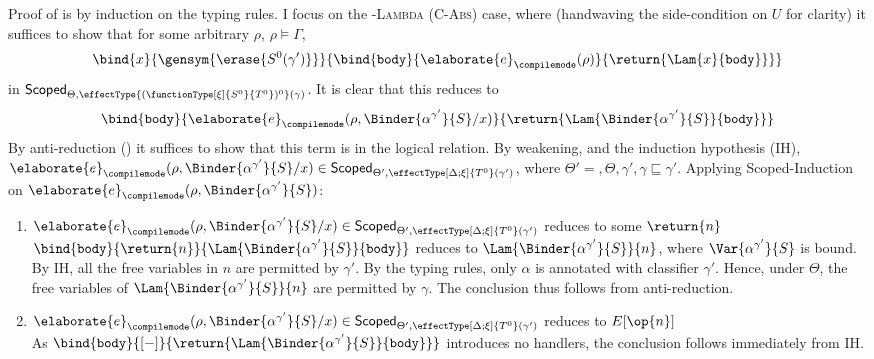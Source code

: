 Proof of  is by induction on the \recLang{} typing rules. I focus on the \textsc{\compilemode{}-Lambda} (\textsc{C-Abs}) case, where (handwaving the side-condition on $U$ for clarity) it suffices to show that for some arbitrary $\rho$, $\rho \vDash \Gamma$, 
\[\bind{x}{\gensym{\erase{S^0 (\gamma')}}}{\bind{\texttt{body}}{\elaborate{e}_{\compilemode}({\rho})}{\return{\Lam{x}{\texttt{body}}}}}\]
in $\scoped{\effectType{(\functionType[\xi]{S^0}{T^0})^0} (\gamma)}$. It is clear that this reduces to
\[{\bind{\texttt{body}}{\elaborate{e}_{\compilemode}({\rho, \Binder{\alpha^{\gamma'}}{S} / x})}{\return{\Lam{\Binder{\alpha^{\gamma'}}{S}}{\texttt{body}}}}}\]
 By anti-reduction () it suffices to show that this term is in the logical relation. By weakening, and the induction hypothesis (IH), $\elaborate{e}_{\compilemode}({\rho, \Binder{\alpha^{\gamma'}}{S} / x}) \in \scoped[\Theta']{\effectType[\Delta; \xi]{T^{0}} (\gamma')}$, where $\Theta' = , \Theta, \gamma', \gamma \sqsubseteq \gamma'$. Applying \textsf{Scoped}-Induction on $\elaborate{e}_{\compilemode}({\rho, \Binder{\alpha^{\gamma'}}{S}})$:
\begin{enumerate}
  \item $\elaborate{e}_{\compilemode}({\rho, \Binder{\alpha^{\gamma'}}{S} / x}) \in \scoped[\Theta']{\effectType[\Delta; \xi]{T^{0}} (\gamma')}$ reduces to some $\return{n}$\\
   $\bind{\texttt{body}}{\return{n}}{\Lam{\Binder{\alpha^{\gamma'}}{S}}{\texttt{body}}}$ reduces to $\Lam{\Binder{\alpha^{\gamma'}}{S}}{n}$, where $\Var{\alpha^{\gamma'}}{S}$ is bound. By IH, all the free variables in $n$ are permitted by $\gamma'$. By the typing rules, only $\alpha$ is annotated with classifier $\gamma'$. Hence, under $\Theta$, the free variables of $\Lam{\Binder{\alpha^{\gamma'}}{S}}{n}$ are permitted by $\gamma$. The conclusion thus follows from anti-reduction.
  \item $\elaborate{e}_{\compilemode}({\rho, \Binder{\alpha^{\gamma'}}{S} / x}) \in \scoped[\Theta']{\effectType[\Delta; \xi]{T^{0}} (\gamma')}$ reduces to $E[\op{n}]$ \\
  As $\bind{\texttt{body}}{[-]}{\return{\Lam{\Binder{\alpha^{\gamma'}}{S}}{\texttt{body}}}}$ introduces no handlers, the conclusion follows immediately from IH.
\end{enumerate}


